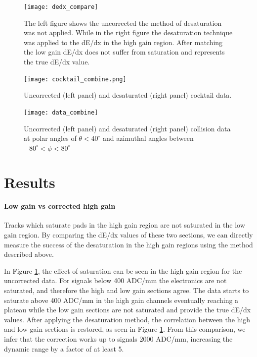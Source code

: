 \documentclass[review]{elsarticle}
\begin{document}
\begin{figure}[t]
\centering
\texttt{[image: dedx\_compare]}
\caption{The left figure shows the uncorrected the method of desaturation was not applied. While in the right figure the desaturation technique was applied to the dE/dx in the high gain region. After matching the low gain dE/dx does not suffer from saturation and represents the true dE/dx value.}
\label{fig:lowvshigh}
\end{figure}

\begin{figure}[t]
\texttt{[image: cocktail\_combine.png]}
\caption{Uncorrected (left panel) and desaturated (right panel) cocktail data.}
\label{fig:cocktail_combine}
\end{figure}

\begin{figure}[t]
\texttt{[image: data\_combine]}
\caption{Uncorrected (left panel) and desaturated (right panel) collision data at polar angles of $\theta < 40^{\circ}$ and azimuthal angles between $-80^{\circ} < \phi < 80^{\circ}$}
\label{fig:data_combine}
\end{figure}

\section{Results}
\paragraph{Low gain vs corrected high gain}

Tracks which saturate pads in the high gain region are not saturated in the low gain region. By comparing the dE/dx values of these two sections, we can directly measure the success of the desaturation in the high gain regions using the method described above.  
 
In Figure \ref{fig:lowvshigh}, the effect of saturation can be seen in the high gain region for the uncorrected data. For signals below 400 ADC/mm the electronics are not saturated, and therefore the high and low gain sections agree. The data starts to saturate above 400 ADC/mm in the high gain channels eventually reaching a plateau while the low gain sections are not saturated and provide the true dE/dx values.
 After applying the desaturation method, the correlation between the high and low gain sections is restored, as seen in Figure \ref{fig:lowvshigh}. From this comparison, we infer that the correction works up to signals 2000 ADC/mm, increasing the dynamic range by a factor of at least 5.
\end{document}
